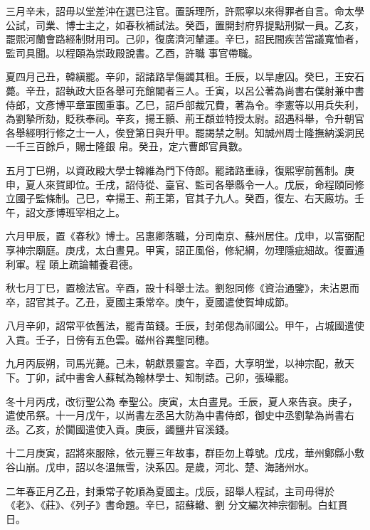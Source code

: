 \begin{pinyinscope}
 三月辛未，詔毋以堂差沖在選已注官。置訴理所，許熙寧以來得罪者自言。命太學公試，司業、博士主之，如春秋補試法。癸酉，置開封府界提點刑獄一員。乙亥，罷熙河蘭會路經制財用司。己卯，復廣濟河輦運。辛巳，詔民間疾苦當議寬恤者，監司具聞。以程頤為崇政殿說書。乙酉，許職
 事官帶職。



 夏四月己丑，韓縝罷。辛卯，詔諸路旱傷蠲其租。壬辰，以旱慮囚。癸巳，王安石薨。辛丑，詔執政大臣各舉可充館閣者三人。壬寅，以呂公著為尚書右僕射兼中書侍郎，文彥博平章軍國重事。乙巳，詔戶部裁冗費，著為令。李憲等以用兵失利，為劉摯所劾，貶秩奉祠。辛亥，揚王顥、荊王頵並特授太尉。詔遇科舉，令升朝官各舉經明行修之士一人，俟登第日與升甲。罷謁禁之制。知誠州周士隆撫納溪洞民一千三百餘戶，賜士隆銀
 帛。癸丑，定六曹郎官員數。



 五月丁巳朔，以資政殿大學士韓維為門下侍郎。罷諸路重祿，復熙寧前舊制。庚申，夏人來賀即位。壬戌，詔侍從、臺官、監司各舉縣令一人。戊辰，命程頤同修立國子監條制。己巳，幸揚王、荊王第，官其子九人。癸酉，復左、右天廄坊。壬午，詔文彥博班宰相之上。



 六月甲辰，置《春秋》博士。呂惠卿落職，分司南京、蘇州居住。戊申，以富弼配享神宗廟庭。庚戌，太白晝見。甲寅，詔正風俗，修紀綱，勿理隱疵細故。復置通利軍。程
 頤上疏論輔養君德。



 秋七月丁巳，置檢法官。辛酉，設十科舉士法。劉恕同修《資治通鑒》，未沾恩而卒，詔官其子。乙丑，夏國主秉常卒。庚午，夏國遣使賀坤成節。



 八月辛卯，詔常平依舊法，罷青苗錢。壬辰，封弟偲為祁國公。甲午，占城國遣使入貢。壬子，日傍有五色雲。磁州谷異壟同穗。



 九月丙辰朔，司馬光薨。己未，朝獻景靈宮。辛酉，大享明堂，以神宗配，赦天下。丁卯，試中書舍人蘇軾為翰林學士、知制誥。己卯，張璪罷。



 冬十月丙戌，改衍聖公為
 奉聖公。庚寅，太白晝見。壬辰，夏人來告哀。庚子，遣使吊祭。十一月戊午，以尚書左丞呂大防為中書侍郎，御史中丞劉摯為尚書右丞。乙亥，於闐國遣使入貢。庚辰，蠲鹽井官溪錢。



 十二月庚寅，詔將來服除，依元豐三年故事，群臣勿上尊號。戊戌，華州鄭縣小敷谷山崩。戊申，詔以冬溫無雪，決系囚。是歲，河北、楚、海諸州水。



 二年春正月乙丑，封秉常子乾順為夏國主。戊辰，詔舉人程試，主司毋得於《老》、《莊》、《列子》書命題。辛巳，詔蘇轍、劉
 分文編次神宗御制。白虹貫日。




\end{pinyinscope}
